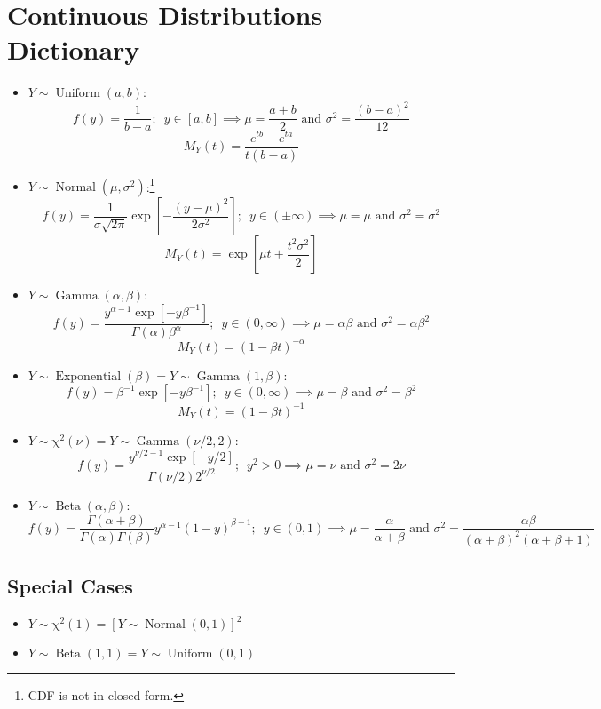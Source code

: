 \documentclass[12pt]{article}
\newcommand{\defn}[1]{\textbf{#1}:}
\newcommand{\unidist}[3]{#1 \sim \operatorname{Uniform}(#2, #3)}
\newcommand{\normdist}[3]{#1 \sim \operatorname{Normal}(#2, #3)}
\newcommand{\expdist}[2]{#1 \sim \operatorname{Exponential}(#2)}
\newcommand{\gamdist}[3]{#1 \sim \operatorname{Gamma}(#2, #3)}
\newcommand{\chidist}[2]{#1 \sim \operatorname{\chi^2}(#2)}
\newcommand{\betdist}[3]{#1 \sim \operatorname{Beta}(#2, #3)}
\renewcommand{\and}{\text{ and }}
\begin{document}
\section{Continuous Distributions Dictionary}
\begin{itemize}
    \item \defn{$\unidist{Y}{a}{b}$} \[
        f(y) = \frac{1}{b-a};
        \enspace y \in [a,b]
        \implies \mu = \frac{a+b}{2} \and \sigma^2 = \frac{(b-a)^2}{12}
    \]
    \[
        M_Y(t) = \frac{e^{tb} - e^{ta}}{t(b-a)}
    \]
    \item \defn{$\normdist{Y}{\mu}{\sigma^2}$}\footnote{CDF is not in closed form.} \[
        f(y) = \frac{1}{\sigma\sqrt{2\pi}}\exp\left[ -\frac{(y-\mu)^2}{2\sigma^2} \right];
        \enspace y\in(\pm \infty)
        \implies \mu = \mu \and \sigma^2 = \sigma^2
    \]
    \[
        M_Y(t) = \exp\left[ \mu t + \frac{t^2\sigma^2}{2} \right]
    \]
    \item \defn{$\gamdist{Y}{\alpha}{\beta}$} \[
        f(y) = \frac{y^{\alpha-1}\exp\left[ -y\beta^{-1} \right]}{\Gamma(\alpha)\beta^\alpha};
        \enspace y\in (0, \infty)
        \implies \mu = \alpha\beta \and \sigma^2 = \alpha\beta^2
    \]
    \[
        M_Y(t) = (1-\beta t)^{-\alpha}
    \]
    \item \defn{$\expdist{Y}{\beta} = \gamdist{Y}{1}{\beta}$} \[
        f(y) = \beta^{-1}\exp\left[ -y\beta^{-1} \right];
        \enspace y\in (0, \infty)
        \implies \mu = \beta \and \sigma^2 = \beta^2
    \]
    \[
        M_Y(t) = (1-\beta t)^{-1}
    \]
    \item \defn{$\chidist{Y}{\nu} = \gamdist{Y}{\nu/2}{2}$}
    \[
        f(y) = \frac{y^{\nu/2-1}\exp\left[ -y/2 \right]  }{\Gamma(\nu/2)2^{\nu/2}};
        \enspace y^2 > 0
        \implies \mu = \nu \and \sigma^2 = 2\nu
    \]
    \item \defn{$\betdist{Y}{\alpha}{\beta}$} \[
        f(y) = \frac{\Gamma(\alpha + \beta)}{\Gamma(\alpha)\Gamma(\beta)}y^{\alpha - 1}(1-y)^{\beta - 1};
        \enspace y\in (0,1)
        \implies \mu = \frac{\alpha}{\alpha + \beta} \and \sigma^2 = \frac{\alpha\beta}{(\alpha+\beta)^2(\alpha + \beta + 1)}
    \]
\end{itemize}
\subsection{Special Cases}
\begin{itemize}
    \item $\chidist{Y}{1} = \left[ \normdist{Y}{0}{1} \right]^2$
    \item $\betdist{Y}{1}{1} = \unidist{Y}{0}{1}$
\end{itemize}
\end{document}
